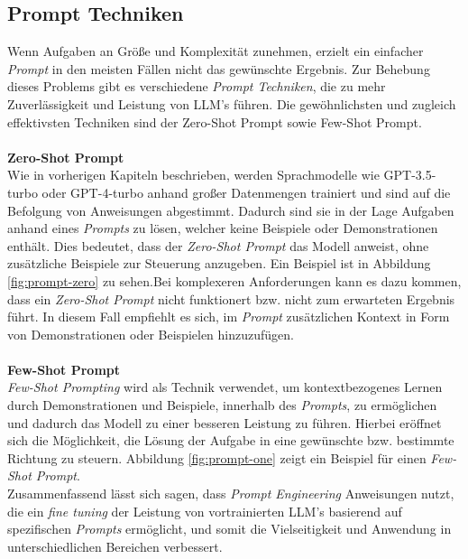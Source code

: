 \subsection{Prompt Techniken}
Wenn Aufgaben an Größe und Komplexität zunehmen, erzielt ein einfacher \textit{Prompt} in den meisten Fällen nicht das gewünschte Ergebnis. Zur Behebung dieses Problems gibt es verschiedene \textit{Prompt Techniken}, die zu mehr Zuverlässigkeit und Leistung von LLM's führen. Die gewöhnlichsten und zugleich effektivsten Techniken sind der Zero-Shot Prompt sowie Few-Shot Prompt. \cite*{PromptEngineeringGuide}\\\\
\textbf{Zero-Shot Prompt}\\[0.2cm]
Wie in vorherigen Kapiteln beschrieben, werden Sprachmodelle wie GPT-3.5-turbo oder GPT-4-turbo anhand großer Datenmengen trainiert und sind auf die Befolgung von Anweisungen abgestimmt. Dadurch sind sie in der Lage Aufgaben anhand eines \textit{Prompts} zu lösen, welcher keine Beispiele oder Demonstrationen enthält. Dies bedeutet, dass der \textit{Zero-Shot Prompt} das Modell anweist, ohne zusätzliche Beispiele zur Steuerung anzugeben. Ein Beispiel ist in Abbildung \ref{fig:prompt-zero} zu sehen.Bei komplexeren Anforderungen kann es dazu kommen, dass ein \textit{Zero-Shot Prompt} nicht funktionert bzw. nicht zum erwarteten Ergebnis führt. In diesem Fall empfiehlt es sich, im \textit{Prompt} zusätzlichen Kontext in Form von Demonstrationen oder Beispielen hinzuzufügen. \cite{PromptEngineeringGuide}\\\\
\textbf{Few-Shot Prompt}\\[0.2cm]
\textit{Few-Shot Prompting} wird als Technik verwendet, um kontextbezogenes Lernen durch Demonstrationen und Beispiele, innerhalb des \textit{Prompts}, zu ermöglichen und dadurch das Modell zu einer besseren Leistung zu führen. Hierbei eröffnet sich die Möglichkeit, die Lösung der Aufgabe in eine gewünschte bzw. bestimmte Richtung zu steuern. Abbildung \ref{fig:prompt-one} zeigt ein Beispiel für einen \textit{Few-Shot Prompt}. \\
Zusammenfassend lässt sich sagen, dass \textit{Prompt Engineering} Anweisungen nutzt, die ein \textit{fine tuning} der Leistung von vortrainierten LLM's basierend auf spezifischen \textit{Prompts} ermöglicht, und somit die Vielseitigkeit und Anwendung in unterschiedlichen Bereichen verbessert. \cite*{sahooSystematicSurveyPrompt2024}

